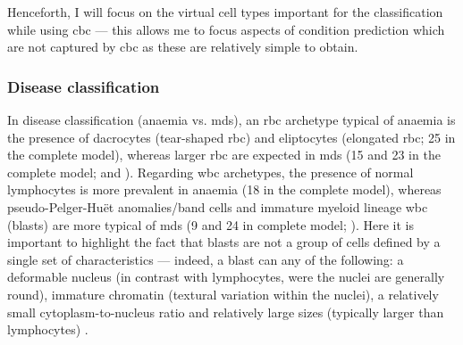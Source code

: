 \begin{figure}[!ht]
    \label{fig:wbc-disease-detection-examples}
\end{figure}

Henceforth, I will focus on the virtual cell types important for the classification while using \ac{cbc} --- this allows me to focus aspects of condition prediction which are not captured by \ac{cbc} as these are relatively simple to obtain. 

\subsubsection{Disease classification} 

In disease classification (anaemia vs. \ac{mds}), an \ac{rbc} archetype typical of anaemia is the presence of dacrocytes (tear-shaped \ac{rbc}) and eliptocytes (elongated \ac{rbc}; 25 in the complete model), whereas larger \ac{rbc} are expected in \ac{mds} (15 and 23 in the complete model;  and ). Regarding \ac{wbc} archetypes, the presence of normal lymphocytes is more prevalent in anaemia (18 in the complete model), whereas pseudo-Pelger-Huët anomalies/band cells and immature myeloid lineage \ac{wbc} (blasts) are more typical of \ac{mds} (9 and 24 in complete model; ). Here it is important to highlight the fact that blasts are not a group of cells defined by a single set of characteristics --- indeed, a blast can any of the following: a deformable nucleus (in contrast with lymphocytes, were the nuclei are generally round), immature chromatin (textural variation within the nuclei), a relatively small cytoplasm-to-nucleus ratio and relatively large sizes (typically larger than lymphocytes) \cite{Bain2004-uq,Bain2005-zg,Bain2014-oc}.

\begin{figure}[!ht]
    \label{fig:mile-vice-vcq-so-disease-classification}
\end{figure}

